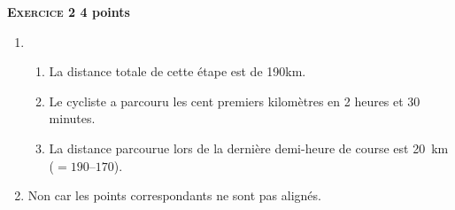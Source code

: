 \textbf{\textsc{Exercice 2} \hfill 4 points}

\medskip

%
%
%
%
%

\begin{enumerate}
\item 
	\begin{enumerate}
		\item %
La distance totale de cette étape est de 190km.
		\item %
Le cycliste a parcouru les cent premiers kilomètres en 2 heures et 30 minutes.
		\item %
La distance parcourue lors de la dernière demi-heure de course est 20~km ($= 190 – 170$).
	\end{enumerate}
\item  %
	
Non car les points correspondants  ne sont pas alignés.
\end{enumerate}

\vspace{0,5cm}

